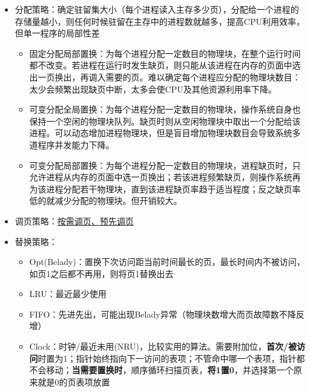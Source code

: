 \begin{itemize}
    \item 分配策略：确定驻留集大小（每个进程读入主存多少页），分配给一个进程的存储量越小，则任何时候驻留在主存中的进程数就越多，提高CPU利用效率，但单一程序的局部性差
    \begin{itemize}
        \item 固定分配局部置换：为每个进程分配一定数目的物理块，在整个运行时间都不改变。若进程在运行时发生缺页，则只能从该进程在内存的页面中选出一页换出，再调入需要的页。难以确定每个进程应分配的物理块数目：太少会频繁出现缺页中断，太多会使CPU及其他资源利用率下降。
        \item 可变分配全局置换：为每个进程分配一定数目的物理块，操作系统自身也保持一个空闲的物理块队列。缺页时则从空闲物理块中取出一个分配给该进程。可以动态增加进程物理块，但是盲目增加物理块数目会导致系统多道程序并发能力下降。
        \item 可变分配局部置换：为每个进程分配一定数目的物理块，进程缺页时，只允许进程从内存的页面中选一页换出；若该进程频繁缺页，则操作系统再为该进程分配若干物理块，直到该进程缺页率趋于适当程度；反之缺页率低的就减少分配的物理块。但开销较大。
    \end{itemize}
    \item 调页策略：\underline{按需调页、预先调页}
    \item 替换策略：
    \begin{itemize}
        \item Opt(Belady)：置换下次访问距当前时间最长的页，最长时间内不被访问，如页1之后都不再用，则将页1替换出去
        \item LRU：最近最少使用
        \item FIFO：先进先出，可能出现Belady异常（物理块数增大而页故障数不降反增）
        \item Clock：时钟/最近未用(NRU)，比较实用的算法。需要附加位，\textbf{首次/被访问}时置为1；指针始终指向下一访问的表项；不管命中哪一个表项，指针都不会移动；\textbf{当需要置换时}，顺序循环扫描页表，\textbf{将1置0}，并选择第一个原来就是0的页表项放置
    \end{itemize}
\end{itemize}
